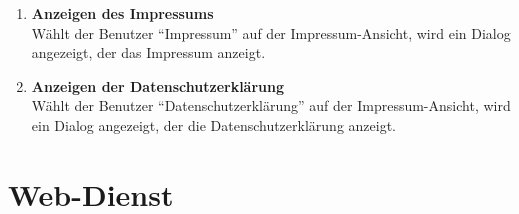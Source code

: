 \begin{enumerate}
\item \label{fa:imprAnzeigen}\textbf{Anzeigen des Impressums} \hfill \\
Wählt der Benutzer ``Impressum'' auf der Impressum-Ansicht, wird ein Dialog angezeigt, der das Impressum anzeigt.

\item  \label{fa:datenschAnzeigen}\textbf{Anzeigen der Datenschutzerklärung} \hfill \\
Wählt der Benutzer ``Datenschutzerklärung'' auf der Impressum-Ansicht, wird ein Dialog angezeigt, der die Datenschutzerklärung anzeigt.

\end{enumerate}

\section{\gls{Web-Dienst}}
